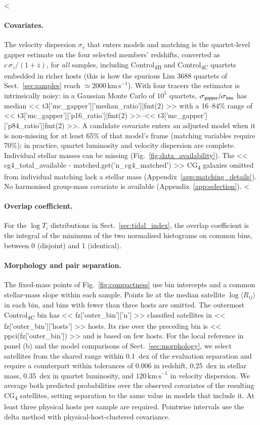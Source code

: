 \documentclass{aa}
\newcommand{\CB}{Control\textsubscript{4B}}
\newcommand{\CC}{Control\textsubscript{4C}}
\newcommand{\CG}{CG\textsubscript{4}}
\newcommand{\kms}{\,\mathrm{km\,s}^{-1}}
\newcommand{\Rmed}{\langle R_{ij}\rangle}
\begin{document}
\begin{appendix}
<%
\paragraph{Covariates.} The velocity dispersion \(\sigma_v\) that enters models and matching is the quartet-level gapper estimate \citep{Wainer&Thissen76} on the four selected members' redshifts, converted as \(c\,\sigma_z/(1+\bar z)\), for \emph{all} samples, including \CB{} and \CC{} quartets embedded in richer hosts (this is how the spurious Lim 3688 quartets of Sect.~\ref{sec:samples} reach \({\simeq}2000\kms\)). With four tracers the estimator is intrinsically noisy: in a Gaussian Monte Carlo of \(10^5\) quartets, \(\sigma_{\rm gapper}/\sigma_{\rm true}\) has median << t3['mc_gapper']['median_ratio']|fmt(2) >> with a 16--84\% range of << t3['mc_gapper']['p16_ratio']|fmt(2) >>--<< t3['mc_gapper']['p84_ratio']|fmt(2) >>. A candidate covariate enters an adjusted model when it is non-missing for at least 65\% of that model's frame (matching variables require 70\%); in practice, quartet luminosity and velocity dispersion are complete. Individual stellar masses can be missing (Fig.~\ref{fig:data_availability}). The << cg4_total_available - matched.get('n_cg4_matched') >> \CG{} galaxies omitted from individual matching lack a stellar mass (Appendix~\ref{app:matching_details}). No harmonised group-mass covariate is available (Appendix~\ref{app:selection}).
<%

\paragraph{Overlap coefficient.} For the \(\log T_i\) distributions in Sect.~\ref{sec:tidal_index}, the overlap coefficient is the integral of the minimum of the two normalised histograms on common bins, between 0 (disjoint) and 1 (identical).

\paragraph{Morphology and pair separation.} The fixed-mass points of Fig.~\ref{fig:compactness} use bin intercepts and a common stellar-mass slope within each sample. Points lie at the median satellite \(\log\Rmed\) in each bin, and bins with fewer than three hosts are omitted. The outermost \CC{} bin has << fz['outer_bin']['n'] >> classified satellites in << fz['outer_bin']['hosts'] >> hosts. Its rise over the preceding bin is << ppci(fz['outer_bin']) >> and is based on few hosts. For the local reference in panel (b) and the model comparisons of Sect.~\ref{sec:morphology}, we select satellites from the shared range within 0.1~dex of the evaluation separation and require a counterpart within tolerances of 0.006 in redshift, 0.25~dex in stellar mass, 0.35~dex in quartet luminosity, and \(120\kms\) in velocity dispersion. We average both predicted probabilities over the observed covariates of the resulting \CG{} satellites, setting separation to the same value in models that include it. At least three physical hosts per sample are required. Pointwise intervals use the delta method with physical-host-clustered covariance.


\end{appendix}
\end{document}
